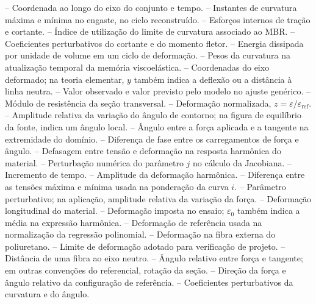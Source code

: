 \documentclass[arial,centeredequations,english,brazilian,oneside,section=TITLE]{ifes8}
\begin{document}
\begin{simbolos}
   -- Coordenada ao longo do eixo do conjunto e tempo.
   -- Instantes de curvatura máxima e mínima no engaste, no ciclo reconstruído.
   -- Esforços internos de tração e cortante.
   -- Índice de utilização do limite de curvatura associado ao MBR.
   -- Coeficientes perturbativos do cortante e do momento fletor.
   -- Energia dissipada por unidade de volume em um ciclo de deformação.
   -- Pesos da curvatura na atualização temporal da memória viscoelástica.
   -- Coordenadas do eixo deformado; na teoria elementar, $y$ também indica a deflexão ou a distância à linha neutra.
   -- Valor observado e valor previsto pelo modelo no ajuste genérico.
   -- Módulo de resistência da seção transversal.
   -- Deformação normalizada, $z=\varepsilon/\varepsilon_{\mathrm{ref}}$.
  \simb{$\alpha$} -- Amplitude relativa da variação do ângulo de contorno; na figura de equilíbrio da fonte, indica um ângulo local.
  \simb{$\beta$} -- Ângulo entre a força aplicada e a tangente na extremidade do domínio.
  \simb{$\gamma$} -- Diferença de fase entre os carregamentos de força e ângulo.
  \simb{$\delta(\omega)$} -- Defasagem entre tensão e deformação na resposta harmônica do material.
   -- Perturbação numérica do parâmetro $j$ no cálculo da Jacobiana.
   -- Incremento de tempo.
  \simb{$\Delta\varepsilon$} -- Amplitude da deformação harmônica.
   -- Diferença entre as tensões máxima e mínima usada na ponderação da curva $i$.
  \simb{$\epsilon$} -- Parâmetro perturbativo; na aplicação, amplitude relativa da variação da força.
  \simb{$\varepsilon$} -- Deformação longitudinal do material.
   -- Deformação imposta no ensaio; $\varepsilon_0$ também indica a média na expressão harmônica.
   -- Deformação de referência usada na normalização da regressão polinomial.
   -- Deformação na fibra externa do poliuretano.
   -- Limite de deformação adotado para verificação de projeto.
  \simb{$\eta$} -- Distância de uma fibra ao eixo neutro.
  \simb{$\theta$} -- Ângulo relativo entre força e tangente; em outras convenções do referencial, rotação da seção.
   -- Direção da força e ângulo relativo da configuração de referência.
   -- Coeficientes perturbativos da curvatura e do ângulo.

\end{simbolos}
\end{document}
